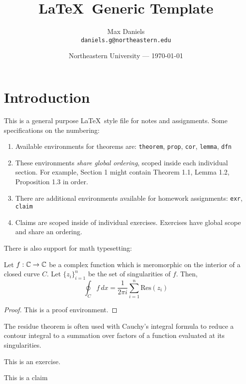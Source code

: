 \documentclass{article}
\title{\LaTeX~Generic Template}
\author{Max Daniels\\ \texttt{daniels.g@northeastern.edu}}
\date{Northeastern University --- \today}
\begin{document}
\maketitle 


\section*{Introduction}
This is a general purpose \LaTeX~style file for notes and assignments. Some specifications on the numbering:
\begin{enumerate}
    \item Available environments for theorems are: \texttt{theorem}, \texttt{prop}, \texttt{cor}, \texttt{lemma}, \texttt{dfn}
    \item These environments \textit{share global ordering}, scoped inside each individual section. For example, Section 1 might contain Theorem 1.1, Lemma 1.2, Proposition 1.3 in order. 
    \item There are additional environments available for homework assignments: \texttt{exr}, \texttt{claim}
    \item Claims are scoped inside of individual exercises. Exercises have global scope and share an ordering.
\end{enumerate}
There is also support for math typesetting:
\begin{thm}
Let $f: {\mathbb C} \to {\mathbb C}$ be a complex function which is meromorphic on the interior of a closed curve $C$. Let $\{z_i\}_{i=1}^n$ be the set of singularities of $f$. Then,
\begin{equation*}
    \oint_{C} f \, dx = \frac{1}{2\pi i} \sum_{i=1}^n \text{Res}(z_i)
\end{equation*}
\end{thm}
\begin{proof}
This is a proof environment.
\end{proof}
\begin{rem}
The residue theorem is often used with Cauchy's integral formula to reduce a contour integral to a summation over factors of a function evaluated at its singularities. 
\end{rem}

\begin{exr}[Given]
This is an exercise.
    \begin{clm}
    This is a claim
    \end{clm}
\end{exr}
\end{document}
